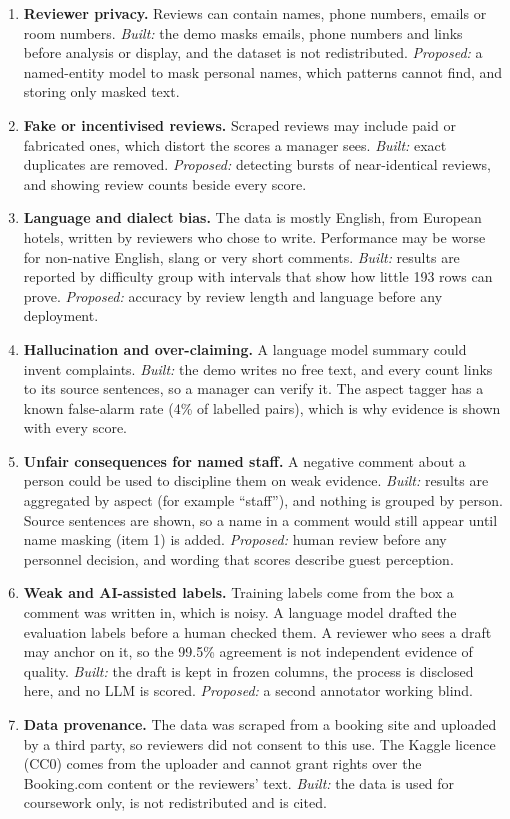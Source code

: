 \documentclass[11pt,a4paper]{article}
\begin{document}
\begin{enumerate}[nosep]
  \item \textbf{Reviewer privacy.} Reviews can contain names, phone numbers, emails or room numbers. \emph{Built:} the demo masks emails, phone numbers and links before analysis or display, and the dataset is not redistributed. \emph{Proposed:} a named-entity model to mask personal names, which patterns cannot find, and storing only masked text.
  \item \textbf{Fake or incentivised reviews.} Scraped reviews may include paid or fabricated ones, which distort the scores a manager sees. \emph{Built:} exact duplicates are removed. \emph{Proposed:} detecting bursts of near-identical reviews, and showing review counts beside every score.
  \item \textbf{Language and dialect bias.} The data is mostly English, from European hotels, written by reviewers who chose to write. Performance may be worse for non-native English, slang or very short comments. \emph{Built:} results are reported by difficulty group with intervals that show how little 193 rows can prove. \emph{Proposed:} accuracy by review length and language before any deployment.
  \item \textbf{Hallucination and over-claiming.} A language model summary could invent complaints. \emph{Built:} the demo writes no free text, and every count links to its source sentences, so a manager can verify it. The aspect tagger has a known false-alarm rate (4\% of labelled pairs), which is why evidence is shown with every score.
  \item \textbf{Unfair consequences for named staff.} A negative comment about a person could be used to discipline them on weak evidence. \emph{Built:} results are aggregated by aspect (for example ``staff''), and nothing is grouped by person. Source sentences are shown, so a name in a comment would still appear until name masking (item 1) is added. \emph{Proposed:} human review before any personnel decision, and wording that scores describe guest perception.
  \item \textbf{Weak and AI-assisted labels.} Training labels come from the box a comment was written in, which is noisy. A language model drafted the evaluation labels before a human checked them. A reviewer who sees a draft may anchor on it, so the 99.5\% agreement is not independent evidence of quality. \emph{Built:} the draft is kept in frozen columns, the process is disclosed here, and no LLM is scored. \emph{Proposed:} a second annotator working blind.
  \item \textbf{Data provenance.} The data was scraped from a booking site and uploaded by a third party, so reviewers did not consent to this use. The Kaggle licence (CC0) comes from the uploader and cannot grant rights over the Booking.com content or the reviewers' text. \emph{Built:} the data is used for coursework only, is not redistributed and is cited.
\end{enumerate}
\end{document}
